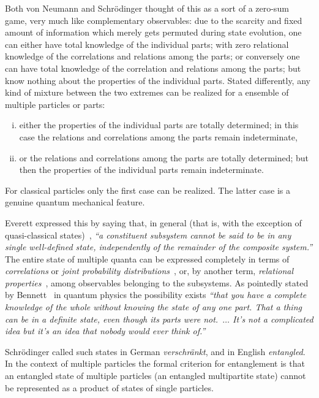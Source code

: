 Both von Neumann and Schr\"odinger thought of this as a sort of a zero-sum game, very much like complementary observables:
due to the scarcity and fixed amount of information which merely gets permuted during state evolution,
one can either have total knowledge of the individual parts; with zero relational  knowledge of the correlations and relations among the parts;
or conversely
one can  have total knowledge of the correlation and relations among the parts; but know nothing about the properties of the individual parts.
Stated differently, any kind of mixture between the two extremes can be realized for a ensemble of multiple particles or parts:
\begin{enumerate}[(i)]
\item
either the properties of the individual parts are totally determined; in this case the relations and correlations among the parts remain indeterminate,
\item
or the relations and correlations among the parts are totally determined; but then the properties of the individual parts remain indeterminate.
\end{enumerate}
For classical particles only the first case can be realized.
The latter case is a genuine quantum mechanical feature.


Everett expressed this by saying that, in general (that is, with the exception of quasi-classical states)~\cite{everett},
{\em ``a constituent subsystem cannot be said to be in
any single well-defined state, independently of the remainder
of the composite system.''}
The entire state of multiple quanta
can be expressed completely in terms
of {\em correlations} or {\em joint probability distributions}~\cite{wootters-1990-localaccOQStates,mermin:753},
or, by another term, {\em relational properties}~\cite{Zeilinger-97,zeil-99},
among observables belonging to the subsystems.
As pointedly stated by Bennett~\cite{Bennett-IBM-03.05.2016}
in quantum physics the possibility exists {\em ``that you have a complete knowledge
of the whole without knowing the state of any one part. That a thing can be in a definite
state, even though its parts were not.~$\ldots$
It's not a complicated idea but
it's an idea that nobody would ever think of.''}

Schr\"odinger called such states in German
{\em verschr\"ankt},
and in English
{\em entangled}.
In the context of  multiple particles
the formal criterion for entanglement is that an entangled state of
multiple particles (an entangled multipartite state)
cannot be represented as a product of states of single particles.


